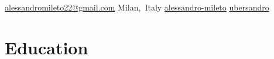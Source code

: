 \documentclass[10pt, letterpaper]{article}
\newenvironment{header}{
        \setlength{\topsep}{0pt}\par\kern\topsep\centering\color{primaryColor}\linespread{1.5}
    }{
        \par\kern\topsep
    } %
\let\hrefWithoutArrow\href
\renewcommand{\href}[2]{\hrefWithoutArrow{#1}{\mbox{\ifthenelse{\equal{#2}{}}{ }{#2 }\raisebox{.15ex}{\footnotesize \faExternalLink*}}}}
\begin{document}
\begin{header}
        \mbox{\hrefWithoutArrow{mailto:alessandromileto22@gmail.com}{{\small\faEnvelope[regular]}\hspace*{0.13cm}alessandromileto22@gmail.com}}
        \hspace*{0.5 cm}
        \mbox{{\small\faMapMarker*}\hspace*{0.13cm}Milan, Italy}
        \hspace*{0.5 cm}
        \mbox{\hrefWithoutArrow{https://linkedin.com/in/alessandro-mileto}{{\small\faLinkedinIn}\hspace*{0.13cm}alessandro-mileto}}
        \hspace*{0.5 cm}
        \mbox{\hrefWithoutArrow{https://github.com/ubersandro}{{\small\faGithub}\hspace*{0.13cm}ubersandro}}
        \hspace*{0.5 cm}
    \end{header}

    \vspace{0.3 cm}








    
    \section{Education}
\end{document}
